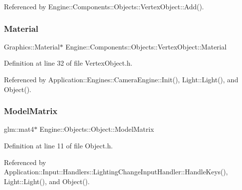 Referenced by Engine\+::\+Components\+::\+Objects\+::\+Vertex\+Object\+::\+Add().

\mbox{\label{classEngine_1_1Components_1_1Objects_1_1VertexObject_a86c1fced4cdc5e59a66a635390a17eca}} 
\subsubsection{\texorpdfstring{Material}{Material}}
{\footnotesize\ttfamily Graphics\+::\+Material$\ast$ Engine\+::\+Components\+::\+Objects\+::\+Vertex\+Object\+::\+Material\hspace{0.3cm}{\ttfamily [inherited]}}



Definition at line 32 of file Vertex\+Object.\+h.



Referenced by Application\+::\+Engines\+::\+Camera\+Engine\+::\+Init(), Light\+::\+Light(), and Object().

\mbox{\label{classEngine_1_1Objects_1_1Object_acf41cc091fa270053245ed26bc28c8a4}} 
\subsubsection{\texorpdfstring{Model\+Matrix}{ModelMatrix}}
{\footnotesize\ttfamily glm\+::mat4$\ast$ Engine\+::\+Objects\+::\+Object\+::\+Model\+Matrix}



Definition at line 11 of file Object.\+h.



Referenced by Application\+::\+Input\+::\+Handlers\+::\+Lighting\+Change\+Input\+Handler\+::\+Handle\+Keys(), Light\+::\+Light(), and Object().

\mbox{\label{classEngine_1_1Components_1_1Objects_1_1VertexObject_a13ec6e4a92520bdd1b33ad6de757cb92}} 
